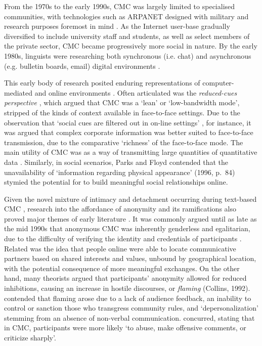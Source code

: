 
From the 1970s to the early 1990s, \gls{CMC} was largely limited to specialised communities, with technologies such as ARPANET designed with military and research purposes foremost in mind \cite{thorne_computer-mediated_2008}. As the Internet user\hyp{}base gradually diversified to include university staff and students, as well as select members of the private sector, \gls{CMC} became progressively more social in nature. By the early 1980s, linguists were researching both synchronous (i.e. chat) and asynchronous (e.g. bulletin boards, email) digital environments \cite[e.g.][]{carey_paralanguage_1980,myers_anonymity_1987,pullinger_chit-chat_1986}.

This early body of research posited enduring representations of computer\hyp{}mediated and online environments \cite{postmes_formation_2000}. Often articulated was the \emph{reduced-cues perspective} \cite{thorne_computer-mediated_2008}, which argued that \gls{CMC} was a `lean' or `low\hyp{}bandwidth mode', stripped of the kinds of context available in face\hyp{}to\hyp{}face settings. Due to the observation that `social cues are filtered out in on\hyp{}line settings' \cite[p.~81]{parks_making_1996}, for instance, it was argued that complex corporate information was better suited to face\hyp{}to\hyp{}face transmission, due to the comparative `richness' of the face\hyp{}to\hyp{}face \gls{mode}. The main utility of \gls{CMC} was as a way of transmitting large quantities of quantitative data \cite{daft_information_1983}. Similarly, in social scenarios, Parks and Floyd contended that the unavailability of `information regarding physical appearance' (1996, p.~84) stymied the potential for  to build meaningful social relationships online.


Given the novel mixture of intimacy and detachment occurring during text\hyp{}based \gls{CMC} \cite{king_researching_1996}, research into the affordance of anonymity and its ramifications also proved major themes of early literature \cite{tanis_two_2007}. It was commonly argued until as late as the mid 1990s that anonymous \gls{CMC} was inherently genderless and egalitarian, due to the difficulty of verifying the identity and credentials of participants \cite{herring_computer-mediated_2001}. Related was the idea that people online were able to locate communicative partners based on shared interests and values, unbound by geographical location, with the potential consequence of more meaningful exchanges. On the other hand, many theorists argued that participants' anonymity allowed for reduced inhibitions, causing an increase in hostile discourses, or \emph{flaming} (Collins, 1992). \textcite{kiesler_social_1984} contended that flaming arose due to a lack of audience feedback, an inability to control or sanction those who transgress community rules, and `depersonalization' stemming from an absence of non\hyp{}verbal communication. \textcite[p.~7]{kim_verbal_1991} concurred, stating that in \gls{CMC}, participants were more likely `to abuse, make offensive comments, or criticize sharply'.

